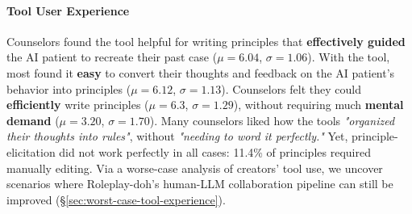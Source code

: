 \documentclass[11pt]{article}
\begin{document}
\paragraph{Tool User Experience} Counselors found the tool helpful for writing principles that \textbf{effectively guided} the AI patient to recreate their past case ($\mu=6.04$, $\sigma=1.06$). With the tool, most found it \textbf{easy} to convert their thoughts and feedback on the AI patient's behavior into principles ($\mu=6.12$, $\sigma=1.13$). Counselors felt they could \textbf{efficiently} write principles ($\mu=6.3$, $\sigma=1.29$), without requiring much \textbf{mental demand} ($\mu=3.20$, $\sigma=1.70$). 
Many counselors liked how the tools \emph{"organized their thoughts into rules"}, without \emph{"needing to word it perfectly."}
Yet, principle-elicitation did not work perfectly in all cases: 11.4\% of principles required manually editing. 
Via a worse-case analysis of creators' tool use, we uncover scenarios where Roleplay-doh's human-LLM collaboration pipeline can still be improved (\S\ref{sec:worst-case-tool-experience}). 



\end{document}
